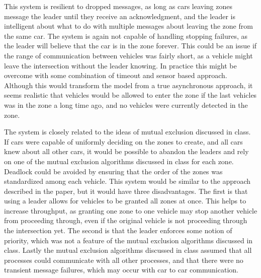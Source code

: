 \documentclass[12pt]{article}
\begin{document}
This system is resilient to dropped messages, as long as cars leaving zones message the leader until they receive an acknowledgment, and the leader is intelligent about what to do with multiple messages about leaving the zone from the same car. The system is again not capable of handling stopping failures, as the leader will believe that the car is in the zone forever. This could be an issue if the range of communication between vehicles was fairly short, as a vehicle might leave the intersection without the leader knowing. In practice this might be overcome with some combination of timeout and sensor based approach. Although this would transform the model from a true asynchronous approach, it seems realistic that vehicles would be allowed to enter the zone if the last vehicles was in the zone a long time ago, and no vehicles were currently detected in the zone. \par
The system is closely related to the ideas of mutual exclusion discussed in class. If cars were capable of uniformly deciding on the zones to create, and all cars knew about all other cars, it would be possible to abandon the leaders and rely on one of the mutual exclusion algorithms discussed in class for each zone. Deadlock could be avoided by ensuring that the order of the zones was standardized among each vehicle. This system would be similar to the approach described in the paper, but it would have three disadvantages. The first is that using a leader allows for vehicles to be granted all zones at once. This helps to increase throughput, as granting one zone to one vehicle may stop another vehicle from proceeding through, even if the original vehicle is not proceeding through the intersection yet. The second is that the leader enforces some notion of priority, which was not a feature of the mutual exclusion algorithms discussed in class. Lastly the mutual exclusion algorithms discussed in class assumed that all processes could communicate with all other processes, and that there were no transient message failures, which may occur with car to car communication.
\end{document}
